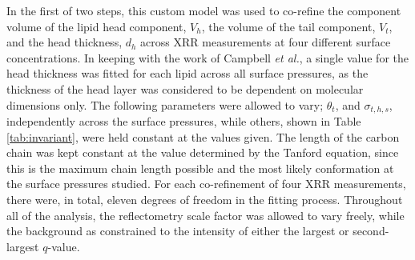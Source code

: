 \documentclass[twoside,twocolumn,9pt]{article}
\begin{document}
In the first of two steps, this custom model was used to co-refine the component volume of the lipid head component, $V_h$, the volume of the tail component, $V_t$, and the head thickness, $d_h$ across XRR measurements at four different surface concentrations. In keeping with the work of Campbell \emph{et al.},\cite{Campbell2018} a single value for the head thickness was fitted for each lipid across all surface pressures, as the thickness of the head layer was considered to be dependent on molecular dimensions only. The following parameters were allowed to vary; $\theta_t$, and $\sigma_{t,h,s}$, independently across the surface pressures, while others, shown in Table \ref{tab:invariant}, were held constant at the values given. The length of the carbon chain was kept constant at the value determined by the Tanford equation,\cite{Tanford1980} since this is the maximum chain length possible and the most likely conformation at the surface pressures studied.\cite{Hollinshead2009} For each co-refinement of four XRR measurements, there were, in total, eleven degrees of freedom in the fitting process. Throughout all of the analysis, the reflectometry scale factor was allowed to vary freely, while the background as constrained to the intensity of either the largest or second-largest $q$-value.
\end{document}
